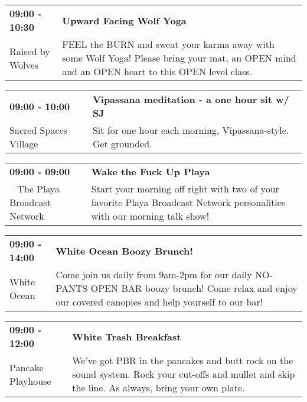 \begin{tabular}{ p{1in} p{2.2in} }
    \textbf{09:00 - 10:30} & \textbf{Upward Facing Wolf Yoga} \\
    Raised by Wolves \newline  & FEEL the BURN and sweat your karma away with some Wolf Yoga! Please bring your mat, an OPEN mind and an OPEN heart to this OPEN level class. \\
    \hline 
\end{tabular}
    
\begin{tabular}{ p{1in} p{2.2in} }
    \textbf{09:00 - 10:00} & \textbf{Vipassana meditation - a one hour sit w/ SJ} \\
    Sacred Spaces Village \newline  & Sit for one hour each morning, Vipassana-style. Get grounded. \\
    \hline 
\end{tabular}
    
\begin{tabular}{ p{1in} p{2.2in} }
    \textbf{09:00 - 09:00} & \textbf{Wake the Fuck Up Playa} \\
    ~ \newline The Playa Broadcast Network & Start your morning off right with two of your favorite Playa Broadcast Network personalities with our morning talk show! \\
    \hline 
\end{tabular}
    
\begin{tabular}{ p{1in} p{2.2in} }
    \textbf{09:00 - 14:00} & \textbf{White Ocean Boozy Brunch!} \\
    White Ocean \newline  & Come join us daily from 9am-2pm for our daily NO-PANTS OPEN BAR boozy brunch! Come relax and enjoy our covered canopies and help yourself to our bar! \\
    \hline 
\end{tabular}
    
\begin{tabular}{ p{1in} p{2.2in} }
    \textbf{09:00 - 12:00} & \textbf{White Trash Breakfast} \\
    Pancake Playhouse \newline  & We've got PBR in the pancakes and butt rock on the sound system. Rock your cut-offs and mullet and skip the line. As always, bring your own plate. \\
    \hline 
\end{tabular}
    
